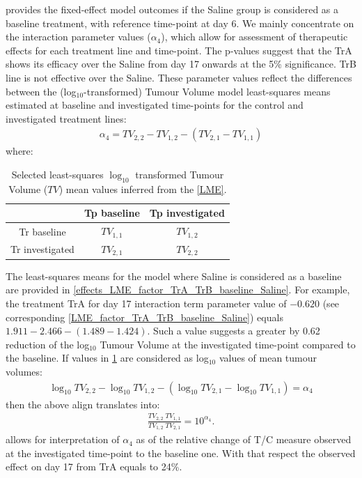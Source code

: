  provides the fixed-effect model outcomes if the Saline group is considered as a baseline treatment, with reference time-point at day 6.
We mainly concentrate on the interaction parameter values ($\alpha_{4}$), which allow for assessment of therapeutic effects for each treatment line and time-point.
The p-values suggest that the TrA shows its efficacy over the Saline from day 17 onwards at the 5\% significance.
TrB line is not effective over the Saline.
These parameter values reflect the differences between the (log$_{10}$-transformed) Tumour Volume model least-squares means estimated at baseline and investigated time-points for the control and investigated treatment lines:
\begin{align}
	\alpha_{4} = TV_{2,2} - TV_{1,2} - (TV_{2,1} - TV_{1,1})
\end{align}
where:
\begin{table}
	\centering
	\small
	\begin{tabular}{c|cc}
		                & Tp baseline & Tp investigated \\
		\hline
		Tr baseline     & $TV_{1,1}$  & $TV_{1,2}$      \\
		Tr investigated & $TV_{2,1}$  & $TV_{2,2}$      \\
	\end{tabular}
	\caption{Selected least-squares $\log_{10}$ transformed Tumour Volume ($TV$) mean values inferred from the \cref{LME}.}
	\label{effects}
\end{table}
The least-squares means for the model where Saline is considered as a baseline are provided in \cref{effects_LME_factor_TrA_TrB_baseline_Saline}.
For example, the treatment TrA for day 17 interaction term parameter value of $-0.620$ (see corresponding \cref{LME_factor_TrA_TrB_baseline_Saline}) equals $1.911 - 2.466 - ( 1.489 - 1.424)$.
Such a value suggests a greater by 0.62 reduction of the log$_{10}$ Tumour Volume at the investigated time-point compared to the baseline.
If values in \cref{effects} are considered as log$_{10}$ values of mean tumour volumes:
\begin{align*}
	\log_{10}TV_{2,2} - \log_{10}TV_{1,2} - (\log_{10}TV_{2,1} - \log_{10}TV_{1,1}) = \alpha_{4}
\end{align*}
then the above align translates into:
\begin{align}
	\label{effect_size}
	\frac{TV_{2,2}\;TV_{1,1}}{TV_{1,2}\;TV_{2,1}} = 10^{\alpha_{4}}.
\end{align}
 allows for interpretation of $\alpha_{4}$ as of the relative change of T/C measure observed at the investigated time-point to the baseline one.
With that respect the observed effect on day 17 from TrA equals to 24\%.



